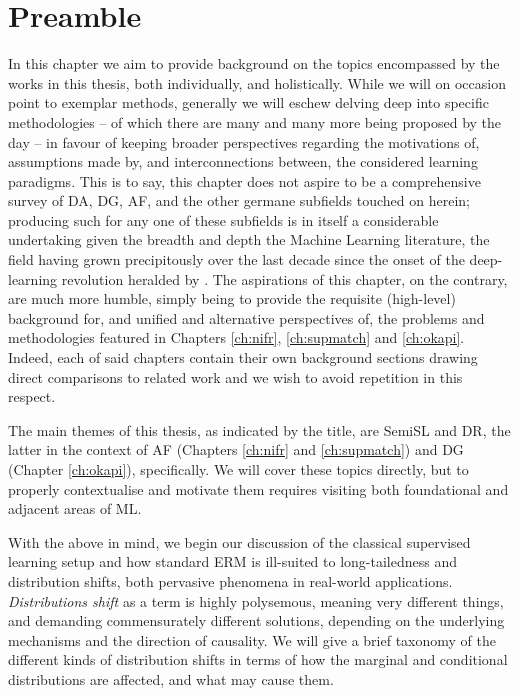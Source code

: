 \section*{Preamble}
\noindent
%
In this chapter we aim to provide background on the topics encompassed by the works in this thesis,
both individually, and holistically.
%
While we will on occasion point to exemplar methods, generally we will eschew delving deep into
specific methodologies -- of which there are many and many more being proposed by the day -- in
favour of keeping broader perspectives regarding the motivations of, assumptions made by, and
interconnections between, the considered learning paradigms. 
%
This is to say, this chapter does not aspire to be a comprehensive survey of \ac{DA}, \ac{DG},
\ac{AF}, and the other germane subfields touched on herein; producing such for any one of these
subfields is in itself a considerable undertaking given the breadth and depth the Machine Learning
literature, the field having grown precipitously over the last decade since the onset of the
deep-learning revolution heralded by \cite{krizhevsky2012imagenet}.
%
The aspirations of this chapter, on the contrary, are much more humble, simply being to provide the
requisite (high-level) background for, and unified and alternative perspectives of, the problems
and methodologies featured in Chapters \ref{ch:nifr}, \ref{ch:supmatch} and \ref{ch:okapi}.
%
Indeed, each of said chapters contain their own background sections drawing direct comparisons to
related work and we wish to avoid repetition in this respect.

The main themes of this thesis, as indicated by the title, are \ac{SemiSL} and \acf{DR}, the latter
in the context of \ac{AF} (Chapters \ref{ch:nifr} and \ref{ch:supmatch}) and \ac{DG} (Chapter
\ref{ch:okapi}), specifically. 
%
We will cover these topics directly, but to properly contextualise and motivate them requires
visiting both foundational and adjacent areas of ML.

%
With the above in mind, we begin our discussion of the classical supervised learning setup and how
standard \acf{ERM} is ill-suited to long-tailedness and distribution shifts,
both pervasive phenomena in real-world applications. 
%
\emph{Distributions shift} as a term is highly polysemous, meaning very different things, and
demanding commensurately different solutions, depending on the underlying mechanisms and the
direction of causality. We will give a brief taxonomy of the different kinds of distribution shifts
in terms of how the marginal and conditional distributions are affected, and what may cause them. 

